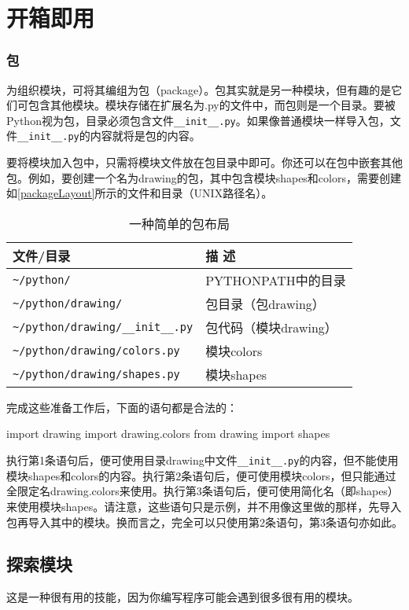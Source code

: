 \chapter{开箱即用\label{chapter10}}
\subsection{包}
为组织模块，可将其编组为包（package）。包其实就是另一种模块，但有趣的是它们可包含其他模块。模块存储在扩展名为.py的文件中，而包则是一个目录。要被Python视为包，目录必须包含文件\verb|__init__.py|。如果像普通模块一样导入包，文件\verb|__init__.py|的内容就将是包的内容。

要将模块加入包中，只需将模块文件放在包目录中即可。你还可以在包中嵌套其他包。例如，要创建一个名为drawing的包，其中包含模块shapes和colors，需要创建如\autoref{packageLayout}所示的文件和目录（UNIX路径名）。

\begin{table}
    \centering
    \caption{一种简单的包布局}
    \label{packageLayout}
    \begin{tabular}{ll}
        \hline
        文件/目录                               & 描 述            \\
         \hline
        \verb|~/python/|                    & PYTHONPATH中的目录 \\
        \verb|~/python/drawing/|            & 包目录（包drawing）  \\
        \verb|~/python/drawing/__init__.py| & 包代码（模块drawing） \\
        \verb|~/python/drawing/colors.py|   & 模块colors       \\
        \verb|~/python/drawing/shapes.py|   & 模块shapes       \\
        \hline
    \end{tabular}
\end{table}

完成这些准备工作后，下面的语句都是合法的：
\begin{pyc}
import drawing
import drawing.colors
from drawing import shapes
\end{pyc}
执行第1条语句后，便可使用目录drawing中文件\verb|__init__.py|的内容，但不能使用模块shapes和colors的内容。执行第2条语句后，便可使用模块colors，但只能通过全限定名drawing.colors来使用。执行第3条语句后，便可使用简化名（即shapes）来使用模块shapes。请注意，这些语句只是示例，并不用像这里做的那样，先导入包再导入其中的模块。换而言之，完全可以只使用第2条语句，第3条语句亦如此。
\section{探索模块}
这是一种很有用的技能，因为你编写程序可能会遇到很多很有用的模块。
